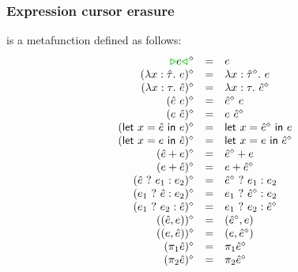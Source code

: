 \documentclass[formalism.tex]{subfiles}
\begin{document}
\subsubsection{Expression cursor erasure}
\label{sec:untyped-expression-cursor-erasure}
\judgbox{\ensuremath{\cursorErase{\ZMV}}} is a metafunction defined as follows:
%
\[\begin{array}{rcl}
  \cursorErasesToRow{\ZCursor{\EMV}}{\EMV} \\
  \cursorErasesToRow{(\ZLamT{x}{\ZTMV}{\EMV})}{\ELam{x}{\cursorErase{\ZTMV}}{\EMV}} \\
  \cursorErasesToRow{(\ZLamE{x}{\TMV}{\ZMV})}{\ELam{x}{\TMV}{\cursorErase{\ZMV}}} \\
  \cursorErasesToRow{(\ZApL{\ZMV}{\EMV})}{\EAp{\cursorErase{\ZMV}}{\EMV}} \\
  \cursorErasesToRow{(\ZApR{\EMV}{\ZMV})}{\EAp{\EMV}{\cursorErase{\ZMV}}} \\
  \cursorErasesToRow{(\ZLetL{x}{\ZMV}{\EMV})}{\ELet{x}{\cursorErase{\ZMV}}{\EMV}} \\
  \cursorErasesToRow{(\ZLetR{x}{\EMV}{\ZMV})}{\ELet{x}{\EMV}{\cursorErase{\ZMV}}} \\
  \cursorErasesToRow{(\ZPlusL{\ZMV}{\EMV})}{\EPlus{\cursorErase{\ZMV}}{\EMV}} \\
  \cursorErasesToRow{(\ZPlusR{\EMV}{\ZMV})}{\EPlus{\EMV}{\cursorErase{\ZMV}}} \\
  \cursorErasesToRow{(\ZIfC{\ZMV}{\EMV_1}{\EMV_2})}{\EIf{\cursorErase{\ZMV}}{\EMV_1}{\EMV_2}} \\
  \cursorErasesToRow{(\ZIfL{\EMV_1}{\ZMV}{\EMV_2})}{\EIf{\EMV_1}{\cursorErase{\ZMV}}{\EMV_2}} \\
  \cursorErasesToRow{(\ZIfL{\EMV_1}{\EMV_2}{\ZMV})}{\EIf{\EMV_1}{\EMV_2}{\cursorErase{\ZMV}}} \\
  \cursorErasesToRow{(\ZPairL{\ZMV}{\EMV})}{\EPair{\cursorErase{\ZMV}}{\EMV}} \\
  \cursorErasesToRow{(\ZPairR{\EMV}{\ZMV})}{\EPair{\EMV}{\cursorErase{\ZMV}}} \\
  \cursorErasesToRow{(\ZProjL{\ZMV})}{\EProjL{\cursorErase{\ZMV}}} \\
  \cursorErasesToRow{(\ZProjR{\ZMV})}{\EProjR{\cursorErase{\ZMV}}} \\
\end{array}\]
\end{document}
